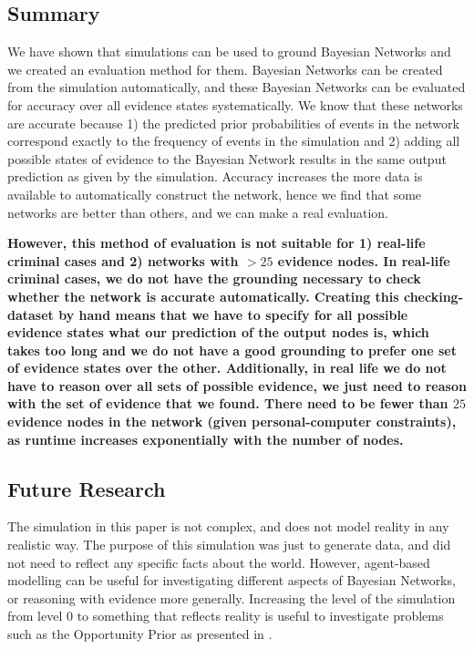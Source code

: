 \documentclass[12pt]{article}
\begin{document}
\subsection{Summary}
We have shown that simulations can be used to ground Bayesian Networks and we created an evaluation method for them. Bayesian Networks can be created from the simulation automatically, and these Bayesian Networks can be evaluated for accuracy over all evidence states systematically. We know that these networks are accurate because 1) the predicted prior probabilities of events in the network correspond exactly to the frequency of events in the simulation and 2) adding all possible states of evidence to the Bayesian Network results in the same output prediction as given by the simulation. Accuracy increases the more data is available to automatically construct the network, hence we find that some networks are better than others, and we can make a real evaluation.

 \textbf{However, this method of evaluation is not suitable for 1) real-life criminal cases and 2) networks with $> 25$ evidence nodes. In real-life criminal cases, we do not have the grounding necessary to check whether the network is accurate automatically. Creating this checking-dataset by hand means that we have to specify for all possible evidence states what our prediction of the output nodes is, which takes too long and we do not have a good grounding to prefer one set of evidence states over the other. Additionally, in real life we do not have to reason over all sets of possible evidence, we just need to reason with the set of evidence that we found. There need to be fewer than $25$ evidence nodes in the network (given personal-computer constraints), as runtime increases exponentially with the number of nodes.}

 
\subsection{Future Research}

The simulation in this paper is not complex, and does not model reality in any realistic way. The purpose of this simulation was just to generate data, and did not need to reflect any specific facts about the world. However, agent-based modelling can be useful for investigating different aspects of Bayesian Networks, or reasoning with evidence more generally. Increasing the level of the simulation from level 0 to something that reflects reality is useful to investigate problems such as the Opportunity Prior as presented in \citet{Fenton2017}. 
\end{document}
